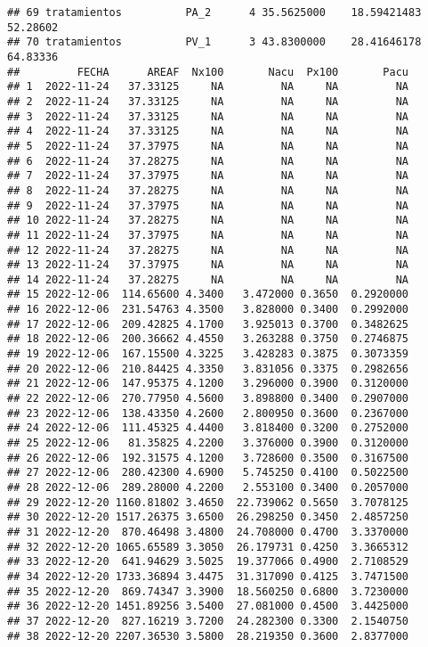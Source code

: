 \documentclass[
]{article}
\begin{document}
\begin{verbatim}
## 69 tratamientos          PA_2      4 35.5625000    18.59421483 52.28602
## 70 tratamientos          PV_1      3 43.8300000    28.41646178 64.83336
##         FECHA      AREAF  Nx100       Nacu  Px100       Pacu
## 1  2022-11-24   37.33125     NA         NA     NA         NA
## 2  2022-11-24   37.33125     NA         NA     NA         NA
## 3  2022-11-24   37.33125     NA         NA     NA         NA
## 4  2022-11-24   37.33125     NA         NA     NA         NA
## 5  2022-11-24   37.37975     NA         NA     NA         NA
## 6  2022-11-24   37.28275     NA         NA     NA         NA
## 7  2022-11-24   37.37975     NA         NA     NA         NA
## 8  2022-11-24   37.28275     NA         NA     NA         NA
## 9  2022-11-24   37.37975     NA         NA     NA         NA
## 10 2022-11-24   37.28275     NA         NA     NA         NA
## 11 2022-11-24   37.37975     NA         NA     NA         NA
## 12 2022-11-24   37.28275     NA         NA     NA         NA
## 13 2022-11-24   37.37975     NA         NA     NA         NA
## 14 2022-11-24   37.28275     NA         NA     NA         NA
## 15 2022-12-06  114.65600 4.3400   3.472000 0.3650  0.2920000
## 16 2022-12-06  231.54763 4.3500   3.828000 0.3400  0.2992000
## 17 2022-12-06  209.42825 4.1700   3.925013 0.3700  0.3482625
## 18 2022-12-06  200.36662 4.4550   3.263288 0.3750  0.2746875
## 19 2022-12-06  167.15500 4.3225   3.428283 0.3875  0.3073359
## 20 2022-12-06  210.84425 4.3350   3.831056 0.3375  0.2982656
## 21 2022-12-06  147.95375 4.1200   3.296000 0.3900  0.3120000
## 22 2022-12-06  270.77950 4.5600   3.898800 0.3400  0.2907000
## 23 2022-12-06  138.43350 4.2600   2.800950 0.3600  0.2367000
## 24 2022-12-06  111.45325 4.4400   3.818400 0.3200  0.2752000
## 25 2022-12-06   81.35825 4.2200   3.376000 0.3900  0.3120000
## 26 2022-12-06  192.31575 4.1200   3.728600 0.3500  0.3167500
## 27 2022-12-06  280.42300 4.6900   5.745250 0.4100  0.5022500
## 28 2022-12-06  289.28000 4.2200   2.553100 0.3400  0.2057000
## 29 2022-12-20 1160.81802 3.4650  22.739062 0.5650  3.7078125
## 30 2022-12-20 1517.26375 3.6500  26.298250 0.3450  2.4857250
## 31 2022-12-20  870.46498 3.4800  24.708000 0.4700  3.3370000
## 32 2022-12-20 1065.65589 3.3050  26.179731 0.4250  3.3665312
## 33 2022-12-20  641.94629 3.5025  19.377066 0.4900  2.7108529
## 34 2022-12-20 1733.36894 3.4475  31.317090 0.4125  3.7471500
## 35 2022-12-20  869.74347 3.3900  18.560250 0.6800  3.7230000
## 36 2022-12-20 1451.89256 3.5400  27.081000 0.4500  3.4425000
## 37 2022-12-20  827.16219 3.7200  24.282300 0.3300  2.1540750
## 38 2022-12-20 2207.36530 3.5800  28.219350 0.3600  2.8377000

\end{verbatim}
\end{document}
